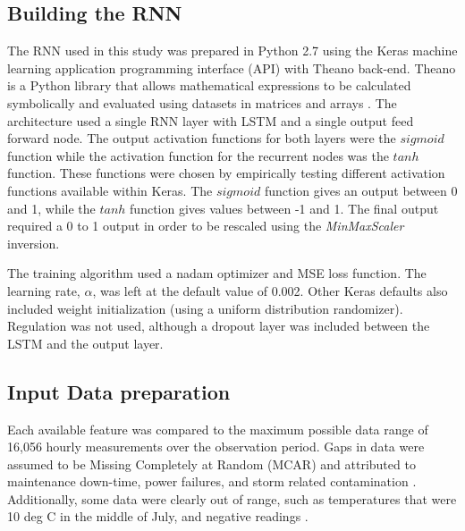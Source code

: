 \documentclass[preprint,12pt,authoryear]{elsarticle}
\begin{document}
\begin{linenumbers}
\subsection{Building the RNN}
The RNN used in this study was prepared in Python 2.7 using the Keras machine learning application programming interface (API) \citep{keras2015} with Theano back-end. Theano is a Python library that allows mathematical expressions to be calculated symbolically and evaluated using datasets in matrices and arrays \citep{Al-Rfou2016}. The architecture used a single RNN layer with LSTM and a single output feed forward node. The output activation functions for both layers were the $sigmoid$ function while the activation function for the recurrent nodes was the $tanh$ function. These functions were chosen by empirically testing different activation functions available within Keras. The $sigmoid$ function gives an output between 0 and 1, while the $tanh$ function gives values between -1 and 1. The final output required a 0 to 1 output in order to be rescaled using the \emph{MinMaxScaler} inversion.

The training algorithm used a nadam optimizer and MSE loss function. The learning rate, $\alpha$, was left at the default value of 0.002. Other Keras defaults also included weight initialization (using a uniform distribution randomizer). Regulation was not used, although a dropout layer was included between the LSTM and the output layer. 

\subsection{Input Data preparation}
Each available feature was compared to the maximum possible data range of 16,056 hourly measurements over the observation period. Gaps in data were assumed to be Missing Completely at Random (MCAR) and attributed to maintenance down-time, power failures, and storm related contamination \citep{Le2007}. Additionally, some data were clearly out of range, such as temperatures that were 10 deg C in the middle of July, and negative readings \citep{Junger2015}.


\end{linenumbers}
\end{document}

